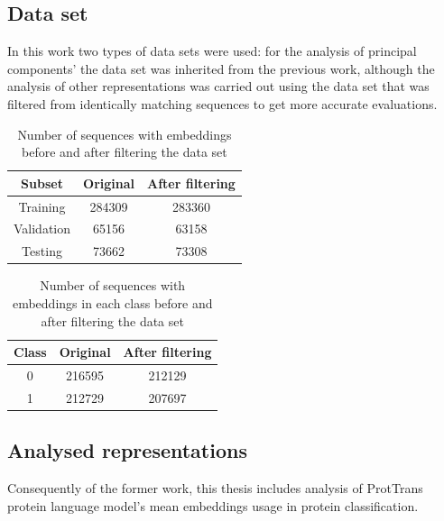 \documentclass[12pt]{article}
\begin{document}
	\subsection{Data set}

	In this work two types of data sets were used: for the analysis of 
	principal components' the data set was inherited from the previous 
	work, although the analysis of other representations was carried 
	out using the data set that was filtered from identically matching 
	sequences to get more accurate evaluations.

	\begin{table}[h!]
		\caption{Number of sequences with embeddings before and after 
		filtering the data set}
		\vspace{0.2cm}
		\centering
		\begin{tabular}{ | c | c c | }
			\hline 
			Subset & Original & After filtering \\
			\hline 
			Training & 284309 & 283360 \\
			Validation & 65156 & 63158 \\
			Testing & 73662 & 73308 \\
			\hline    
		\end{tabular}
		\label{table:numberEmbeddings}
	\end{table}

	\begin{table}[h!]
		\caption{Number of sequences with embeddings in each class 
		before and after filtering the data set}
		\vspace{0.2cm}
		\centering
		\begin{tabular}{ | c | c c | }
			\hline 
			Class & Original & After filtering \\
			\hline 
			0 & 216595 & 212129 \\
			1 & 212729 & 207697 \\
			\hline    
		\end{tabular}
		\label{table:numberEmbeddingsClasses}
	\end{table}

	\newpage

	\subsection{Analysed representations}
	\label{analysedRepresentations}

	Consequently of the former work, this thesis includes 
	analysis of ProtTrans protein language model's mean embeddings 
	usage in protein classification. 
\end{document}

